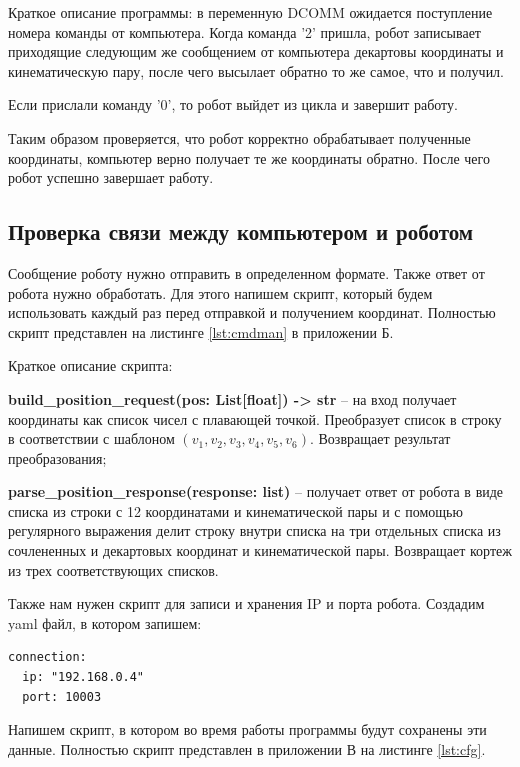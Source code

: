\documentclass[a4paper,14pt]{extarticle}
\begin{document}
Краткое описание программы: в переменную DCOMM ожидается поступление
номера команды от компьютера. Когда команда '2' пришла, робот
записывает приходящие следующим же сообщением от компьютера
декартовы координаты и кинематическую пару, после чего
высылает обратно то же самое, что и получил.


Если прислали команду '0', то робот выйдет из цикла и завершит работу.


Таким образом проверяется, что робот корректно обрабатывает
полученные координаты, компьютер верно получает те же координаты обратно.
После чего робот успешно завершает работу.


\subsection{Проверка связи между компьютером и роботом}
Сообщение роботу нужно отправить в определенном формате.
Также ответ от робота нужно обработать. Для этого
напишем скрипт, который будем использовать каждый раз перед
отправкой и получением координат. Полностью скрипт
представлен на листинге \ref{lst:cmdman} в приложении Б.


Краткое описание скрипта:
\begin{compactitem}
    \item \textbf{build\_position\_request(pos: List[float]) -> str} --
    на вход получает координаты как список чисел с плавающей точкой.
    Преобразует список в строку в соответствии с шаблоном $\left( v_1,v_2,v_3,v_4,v_5,v_6 \right)$.
    Возвращает результат преобразования;
    \item \textbf{parse\_position\_response(response: list)} --
    получает ответ от робота в виде списка из строки с 12 координатами
    и кинематической пары и с помощью регулярного выражения
    делит строку внутри списка на три отдельных списка из сочлененных
    и декартовых координат и кинематической пары. Возвращает кортеж
    из трех соответствующих списков.
\end{compactitem}


Также нам нужен скрипт для записи и хранения IP и порта робота.
Создадим yaml файл, в котором запишем:
\begin{lstlisting}[label=yaml, caption={Файл, где хранятся данные для подключения к роботу-манипулятору.}]
connection:
  ip: "192.168.0.4"
  port: 10003
\end{lstlisting}


Напишем скрипт, в котором во время работы программы будут сохранены
эти данные. Полностью скрипт представлен в приложении В на листинге \ref{lst:cfg}.
\end{document}
